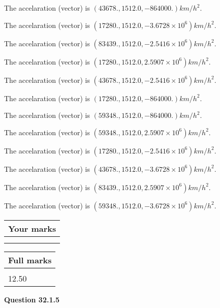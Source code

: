 \documentclass[12pt]{article}
\begin{document}
  
 
 
The accelaration (vector) is
$(
43678.,
1512.0 ,
-864000.
)km/h^2.
$
 
 
The accelaration (vector) is
$(
17280.,
1512.0 ,
-3.6728 \times 10^{6}
)km/h^2.
$
 
 
The accelaration (vector) is
$(
83439.,
1512.0 ,
-2.5416 \times 10^{6}
)km/h^2.
$
 
 
The accelaration (vector) is
$(
17280.,
1512.0 ,
2.5907 \times 10^{6}
)km/h^2.
$
 
 
The accelaration (vector) is
$(
43678.,
1512.0 ,
-2.5416 \times 10^{6}
)km/h^2.
$
 
 
The accelaration (vector) is
$(
17280.,
1512.0 ,
-864000.
)km/h^2.
$
 
 
The accelaration (vector) is
$(
59348.,
1512.0 ,
-864000.
)km/h^2.
$
 
 
The accelaration (vector) is
$(
59348.,
1512.0 ,
2.5907 \times 10^{6}
)km/h^2.
$
 
 
The accelaration (vector) is
$(
17280.,
1512.0 ,
-2.5416 \times 10^{6}
)km/h^2.
$
 
 
The accelaration (vector) is
$(
43678.,
1512.0 ,
-3.6728 \times 10^{6}
)km/h^2.
$
 
 
The accelaration (vector) is
$(
83439.,
1512.0 ,
2.5907 \times 10^{6}
)km/h^2.
$
 
 
The accelaration (vector) is
$(
59348.,
1512.0 ,
-3.6728 \times 10^{6}
)km/h^2.
$
 
 
 
 

 
 
\vspace{0.3in}
  
\vspace{0.2in}
  
         \begin{tabular}{|l|}
\hline
 Your marks  \\
\hline
 \\ 
 \\ 
\hline
\end{tabular}
\hspace{0.05in} \begin{tabular}{|l|}
\hline
 Full marks  \\
\hline
 \\ 
12.50 \\
\hline
\end{tabular}
{\textbf{\Large{Question
32.1.5 
}}}
  
\end{document}
